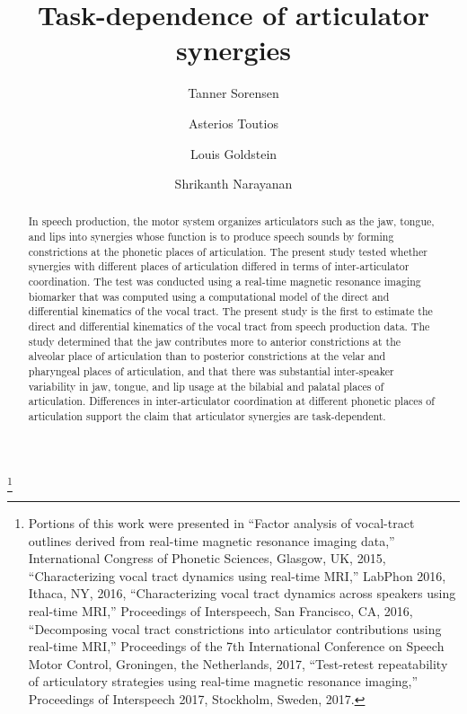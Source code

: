 \documentclass[preprint]{JASAnew}\usepackage[]{graphicx}\usepackage[]{color}
\begin{document}
\title[Task dependence of articulator synergies]{Task-dependence of articulator synergies}

\thanks{Portions of this work were presented in 
``Factor analysis of vocal-tract outlines derived from real-time magnetic resonance imaging data,'' International Congress of Phonetic Sciences, Glasgow, UK, 2015,
``Characterizing vocal tract dynamics using real-time MRI,'' LabPhon 2016, Ithaca, NY, 2016,
``Characterizing vocal tract dynamics across speakers using real-time MRI,'' Proceedings of Interspeech, San Francisco, CA, 2016, 
``Decomposing vocal tract constrictions into articulator contributions using real-time MRI,'' Proceedings of the 7th International Conference on Speech Motor Control, Groningen, the Netherlands, 2017,
``Test-retest repeatability of articulatory strategies using real-time magnetic resonance imaging,'' Proceedings of Interspeech 2017, Stockholm, Sweden, 2017.}

\author{Tanner Sorensen}

\author{Asterios Toutios}

\author{Louis Goldstein}

\author{Shrikanth Narayanan}

\begin{abstract}
In speech production, the motor system organizes articulators such as the jaw, tongue, and lips into synergies whose function is to produce speech sounds by forming constrictions at the phonetic places of articulation.
%
The present study tested whether synergies with different places of articulation differed in terms of inter-articulator coordination.
%
The test was conducted using a real-time magnetic resonance imaging biomarker that was computed using a computational model of the direct and differential kinematics of the vocal tract. 
%
The present study is the first to estimate the direct and differential kinematics of the vocal tract from speech production data.
%
The study determined that the jaw contributes more to anterior constrictions at the alveolar place of articulation than to posterior constrictions at the velar and pharyngeal places of articulation, and that there was substantial inter-speaker variability in jaw, tongue, and lip usage at the bilabial and palatal places of articulation. 
%
Differences in inter-articulator coordination at different phonetic places of articulation support the claim that articulator synergies are task-dependent.
\end{abstract}
\end{document}
